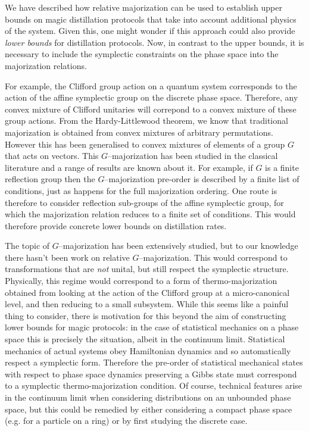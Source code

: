 \documentclass[pra,
aps,
twocolumn,
superscriptaddress,
groupedaddress,
nofootinbib,
reprint
]{revtex4-1}
\begin{document}
We have described how relative majorization can be used to establish upper bounds on magic distillation protocols that take into account additional physics of the system. Given this, one might wonder if this approach could also provide \emph{lower bounds} for distillation protocols. Now, in contrast to the upper bounds, it is necessary to include the symplectic constraints on the phase space into the majorization relations.

  For example, the Clifford group action on a quantum system corresponds to the action of the affine symplectic group on the discrete phase space. Therefore, any convex mixture of Clifford unitaries will correpond to a convex mixture of these group actions. From the Hardy-Littlewood theorem, we know that traditional majorization is obtained from convex mixtures of arbitrary permutations. However this has been generalised to convex mixtures of elements of a group $G$ that acts on vectors. This $G$--majorization has been studied in the classical literature and a range of results are known about it. For example, if $G$ is a finite reflection group then the $G$--majorization pre-order is described by a finite list of conditions, just as happens for the full majorization ordering. One route is therefore to consider reflection sub-groups of the affine symplectic group, for which the majorization relation reduces to a finite set of conditions. This would therefore provide concrete lower bounds on distillation rates.
  
  The topic of $G$--majorization has been extensively studied, but to our knowledge there hasn't been work on relative $G$--majorization. This would correspond to transformations that are \emph{not} unital, but still respect the symplectic structure. Physically, this regime would correspond to a form of thermo-majorization obtained from looking at the action of the Clifford group at a micro-canonical level, and then reducing to a small subsystem. While this seems like a painful thing to consider, there is motivation for this beyond the aim of constructing lower bounds for magic protocols: in the case of statistical mechanics on a phase space this is precisely the situation, albeit in the continuum limit. Statistical mechanics of actual systems obey Hamiltonian dynamics and so automatically respect a symplectic form. Therefore the pre-order of statistical mechanical states with respect to phase space dynamics preserving a Gibbs state must correspond to a symplectic thermo-majorization condition. Of course, technical features arise in the continuum limit when considering distributions on an unbounded phase space, but this could be remedied by either considering a compact phase space (e.g. for a particle on a ring) or by first studying the discrete case.
\end{document}
